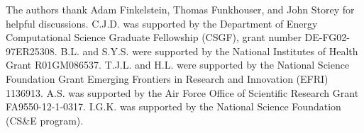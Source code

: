 \documentclass{pnastwo}
\begin{document}
\begin{article}
\begin{materials}
\end{materials}




\begin{acknowledgments}
The authors thank Adam Finkelstein,  Thomas Funkhouser, and John Storey for helpful discussions. 
%
C.J.D. was supported by the Department of Energy Computational Science Graduate Fellowship (CSGF), grant number DE-FG02-97ER25308.
%
B.L. and S.Y.S. were supported by the National Institutes of Health Grant R01GM086537. 
%
T.J.L. and H.L. were supported by the National Science Foundation Grant Emerging Frontiers in Research and Innovation (EFRI) 1136913.
%
A.S. was supported by the Air Force Office of Scientific Research Grant
FA9550-12-1-0317.
%
I.G.K. was supported by the National Science Foundation (CS\&E program).
\end{acknowledgments}









\end{article}
\end{document}
